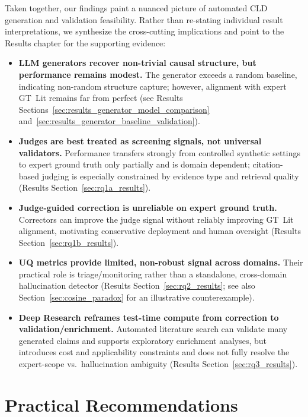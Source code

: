 Taken together, our findings paint a nuanced picture of automated CLD generation and validation feasibility. Rather than re-stating individual result interpretations, we synthesize the cross-cutting implications and point to the Results chapter for the supporting evidence:

\begin{itemize}[noitemsep]
    \item \textbf{LLM generators recover non-trivial causal structure, but performance remains modest.} The generator exceeds a random baseline, indicating non-random structure capture; however, alignment with expert GT~Lit remains far from perfect (see Results Sections~\ref{sec:results_generator_model_comparison} and~\ref{sec:results_generator_baseline_validation}).
    \item \textbf{Judges are best treated as screening signals, not universal validators.} Performance transfers strongly from controlled synthetic settings to expert ground truth only partially and is domain dependent; citation-based judging is especially constrained by evidence type and retrieval quality (Results Section~\ref{sec:rq1a_results}).
    \item \textbf{Judge-guided correction is unreliable on expert ground truth.} Correctors can improve the judge signal without reliably improving GT~Lit alignment, motivating conservative deployment and human oversight (Results Section~\ref{sec:rq1b_results}).
    \item \textbf{UQ metrics provide limited, non-robust signal across domains.} Their practical role is triage/monitoring rather than a standalone, cross-domain hallucination detector (Results Section~\ref{sec:rq2_results}; see also Section~\ref{sec:cosine_paradox} for an illustrative counterexample).
    \item \textbf{Deep Research reframes test-time compute from correction to validation/enrichment.} Automated literature search can validate many generated claims and supports exploratory enrichment analyses, but introduces cost and applicability constraints and does not fully resolve the expert-scope vs.\ hallucination ambiguity (Results Section~\ref{sec:rq3_results}).
\end{itemize}

\section{Practical Recommendations}
\label{sec:discussion_recommendations}

